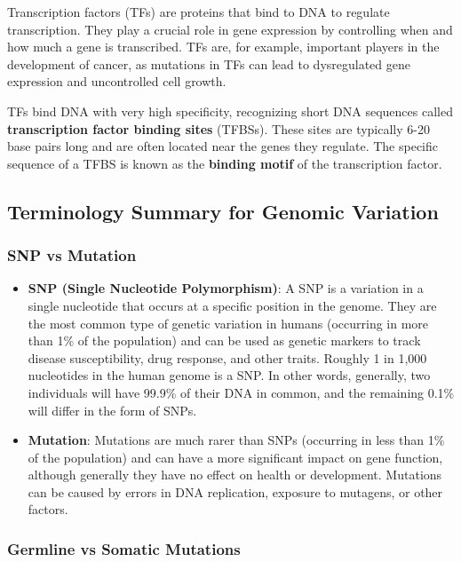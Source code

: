 \documentclass[a4paper]{article}
\begin{document}
Transcription factors (TFs) are proteins that bind to DNA to regulate
transcription. They play a crucial role in gene expression by controlling
when and how much a gene is transcribed. TFs are, for example, important
players in the development of cancer, as mutations in TFs can lead to
dysregulated gene expression and uncontrolled cell growth.

TFs bind DNA with very high specificity, recognizing short DNA sequences
called \textbf{transcription factor binding sites} (TFBSs). These sites are
typically 6-20 base pairs long and are often located near the genes they
regulate. The specific sequence of a TFBS is known as the \textbf{binding motif} 
of the transcription factor.

\subsection*{Terminology Summary for Genomic Variation}

\subsubsection*{SNP vs Mutation}

\begin{itemize}
  \item \textbf{SNP (Single Nucleotide Polymorphism)}: A SNP is a variation in a 
  single nucleotide that occurs at a specific position in the genome. They
  are the most common type of genetic variation in humans (occurring in
  more than 1\% of the population) and can be used as genetic markers to
  track disease susceptibility, drug response, and other traits.
  Roughly 1 in 1,000 nucleotides in the human genome is a SNP. In other words,
  generally, two individuals will have 99.9\% of their DNA in common, and the
  remaining 0.1\% will differ in the form of SNPs.
  
  \item \textbf{Mutation}: Mutations are much rarer than SNPs (occurring in less
  than 1\% of the population) and can have a more significant impact on
  gene function, although generally they have no effect on health or development.
  Mutations can be caused by errors in DNA replication, exposure to mutagens,
  or other factors.
\end{itemize}

\subsubsection*{Germline vs Somatic Mutations}
\end{document}

